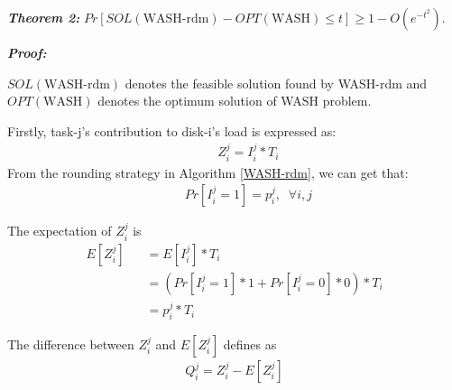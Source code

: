\documentclass[conference]{IEEEtran}
\begin{document}
\emph{\textbf{Theorem 2:}} $Pr[SOL(\text{WASH-rdm}) - OPT(\text{WASH}) \leq t] \geq 1 - O(e^{-t^2})$.

\emph{\textbf{Proof:}}

$SOL(\text{WASH-rdm})$ denotes the feasible solution found by WASH-rdm  and $OPT(\text{WASH})$ denotes the optimum solution of WASH problem.

Firstly, task-j's contribution to disk-i's load is expressed as:
 \begin{align}
&\;\;\;\;\;Z_i^j = I_i^j*T_i
\end{align}
From the rounding strategy in Algorithm \ref{WASH-rdm}, we can get that:
 \begin{align}
&\;\;\;\;\;Pr[I_i^j = 1] = p_i^j,\;\;\forall i,j \nonumber
\end{align}

The expectation of $Z_i^j$ is
\begin{align}
E[Z_i^j] &\;\;\;= E[I_i^j]*T_i \nonumber\\
&\;\;\;= (Pr[I_i^j = 1] * 1 + Pr[I_i^j = 0] * 0)*T_i \nonumber\\
&\;\;\;= p_i^j*T_i\label{prove:expect}
\end{align}

The difference between $Z_i^j$ and $E[Z_i^j]$ defines as
\begin{align}
Q_i^j = Z_i^j - E[Z_i^j]\label{prove:diff}
\end{align}
\end{document}
